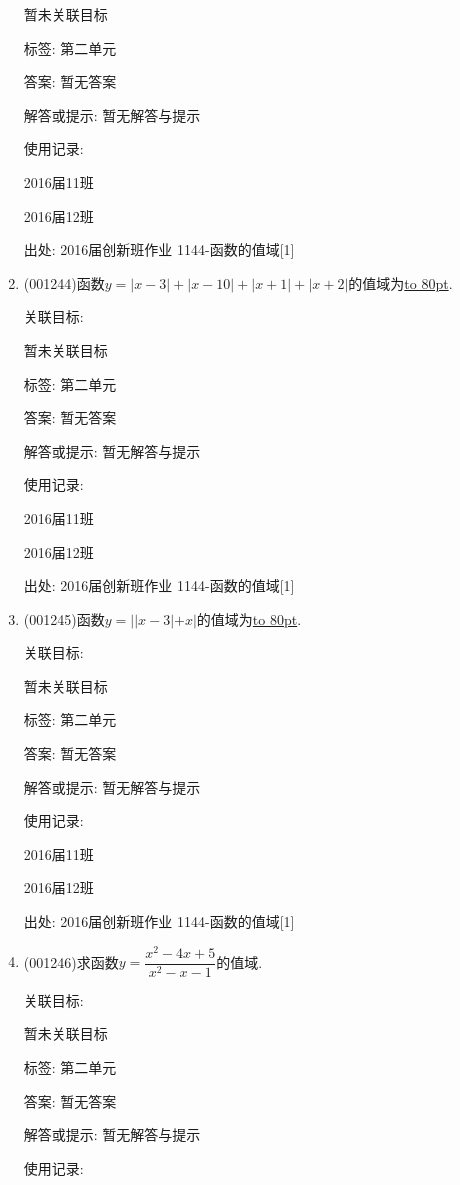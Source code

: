 \documentclass[10pt,a4paper]{article}
\newcommand{\blank}[1]{\underline{\hbox to #1pt{}}}
\begin{document}
\begin{enumerate}[1.]
暂未关联目标



标签: 第二单元

答案: 暂无答案

解答或提示: 暂无解答与提示

使用记录:

2016届11班	

2016届12班	


出处: 2016届创新班作业	1144-函数的值域[1]
\item { (001244)}函数$y=|x-3|+|x-10|+|x+1|+|x+2|$的值域为\blank{80}.


关联目标:

暂未关联目标



标签: 第二单元

答案: 暂无答案

解答或提示: 暂无解答与提示

使用记录:

2016届11班	

2016届12班	


出处: 2016届创新班作业	1144-函数的值域[1]
\item { (001245)}函数$y=||x-3|+x|$的值域为\blank{80}.


关联目标:

暂未关联目标



标签: 第二单元

答案: 暂无答案

解答或提示: 暂无解答与提示

使用记录:

2016届11班	

2016届12班	


出处: 2016届创新班作业	1144-函数的值域[1]
\item { (001246)}求函数$y=\dfrac{x^2-4x+5}{x^2-x-1}$的值域.


关联目标:

暂未关联目标



标签: 第二单元

答案: 暂无答案

解答或提示: 暂无解答与提示

使用记录:


\end{enumerate}
\end{document}
